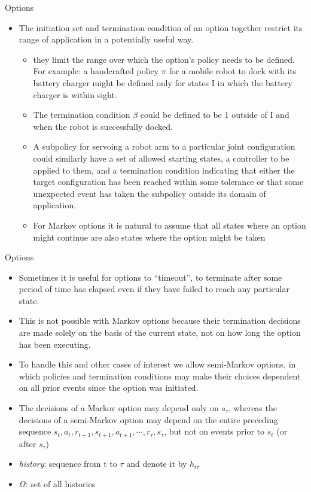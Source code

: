 \begin{frame}{Options}
    \begin{itemize}
        \item The initiation set and termination condition of an option together restrict its range of application in a potentially useful way.
        \begin{itemize}
            \item they limit the range over which the option’s policy needs to be defined. For example:
            a handcrafted policy $\pi$ for a mobile robot to dock with its battery charger might be defined only for states I in which the battery charger is within sight.
            \item The termination condition $\beta$ could be defined to be 1 outside of I and when the robot is successfully docked.
            \item A subpolicy for servoing a robot arm to a particular joint configuration could similarly have a set of allowed starting states, a controller to be applied to them, and a termination condition indicating that either the target configuration has been reached within some tolerance or that some unexpected event has taken the subpolicy outside its domain of application.
            \item For Markov options it is natural to assume that all states where an option might continue are also states where the option might be taken
        \end{itemize}
    \end{itemize}
\end{frame}

\begin{frame}{Options}
    \begin{itemize}
        \item Sometimes it is useful for options to “timeout”, to terminate after some period of time has elapsed even if they have failed to reach any particular state.
        \item This is not possible with Markov options because their termination decisions are made solely on the basis of the current state, not on how long the option has been executing.
        \item To handle this and other cases of interest we allow semi-Markov options, in which policies and termination conditions may make their choices dependent on all prior events since the option was initiated.
        \item The decisions of a Markov option may depend only on $s_\tau$, whereas the decisions of a semi-Markov option may depend on the entire preceding sequence $s_t, a_t, r_{t+1}, s_{t+1}, a_{t+1},\cdots,r_\tau, s_\tau$, but not on events prior to $s_t$ (or after $s_\tau$)
        \item \textit{history}: sequence from t to $\tau$ and denote it by $h_{t\tau}$
        \item $\Omega$: set of all histories
    \end{itemize}
\end{frame}

